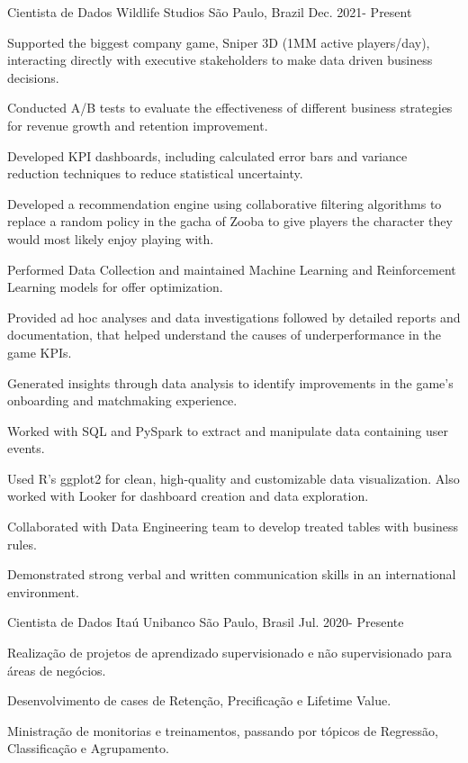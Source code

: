 \begin{cventries}
    \cventry
    {Cientista de Dados}
    {Wildlife Studios}
    {São Paulo, Brazil}
    {Dec. 2021- Present}
    {
      \begin{cvitems}
        \item {Supported the biggest company game, Sniper 3D (1MM active players/day), interacting directly with executive stakeholders to make data driven business decisions. }
        \item {Conducted A/B tests to evaluate the effectiveness of different business strategies for revenue growth and retention improvement. }
        \item {Developed KPI dashboards, including calculated error bars and variance reduction techniques to reduce statistical uncertainty. }
        \item {Developed a recommendation engine using collaborative filtering algorithms to replace a random policy in the gacha of Zooba to give players the character they would most likely enjoy playing with. }
        \item {Performed Data Collection and maintained Machine Learning and Reinforcement Learning models for offer optimization.}
        \item {Provided ad hoc analyses and data investigations followed by detailed reports and documentation, that helped understand the causes of underperformance in the game KPIs. }
        \item {Generated insights through data analysis to identify improvements in the game's onboarding and matchmaking experience. }
        \item {Worked with SQL and PySpark to extract and manipulate data containing user events. }
        \item {Used R's ggplot2 for clean, high-quality and customizable data visualization. Also worked with Looker for dashboard creation and data exploration. }
        \item {Collaborated with Data Engineering team to develop treated tables with business rules. }
        \item {Demonstrated  strong verbal and written communication skills in an international environment. }
      \end{cvitems}
    }
    \cventry
    {Cientista de Dados}
    {Itaú Unibanco}
    {São Paulo, Brasil}
    {Jul. 2020- Presente}
    {
      \begin{cvitems}
        \item {Realização de projetos de aprendizado supervisionado e não supervisionado para áreas de negócios. }
        \item {Desenvolvimento de cases de Retenção, Precificação e Lifetime Value. }
        \item {Ministração de monitorias e treinamentos, passando por tópicos de Regressão, Classificação e Agrupamento. }
      \end{cvitems}
    }


\end{cventries}
